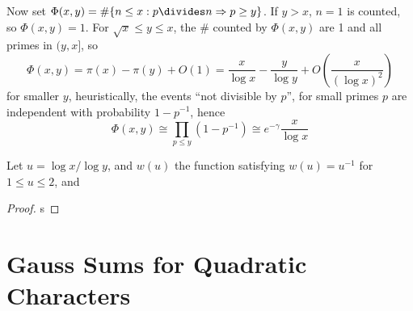 Now set $\Phi(x,y) = \# \{ n \leq x: p \divides n \Rightarrow p \geq y \}$. If $y > x$, $n = 1$ is counted, so $\Phi(x,y) = 1$. For $\sqrt{x} \leq y \leq x$, the $\#$ counted by $\Phi(x,y)$ are 1 and all primes in $(y,x]$, so
%
\[ \Phi(x,y) = \pi(x) - \pi(y) + O(1) = \frac{x}{\log x} - \frac{y}{\log y} + O \left( \frac{x}{(\log x)^2} \right) \]
%
for smaller $y$, heuristically, the events ``not divisible by $p$'', for small primes $p$ are independent with probability $1 - p^{-1}$, hence
%
\[ \Phi(x,y) \cong \prod_{p \leq y} (1 - p^{-1}) \cong e^{-\gamma} \frac{x}{\log x} \]

\begin{theorem}[Buchstab]
    Let $u = \log x / \log y$, and $w(u)$ the function satisfying $w(u) = u^{-1}$ for $1 \leq u \leq 2$, and 
\end{theorem}
\begin{proof}
    s
\end{proof}

\section{Gauss Sums for Quadratic Characters}

